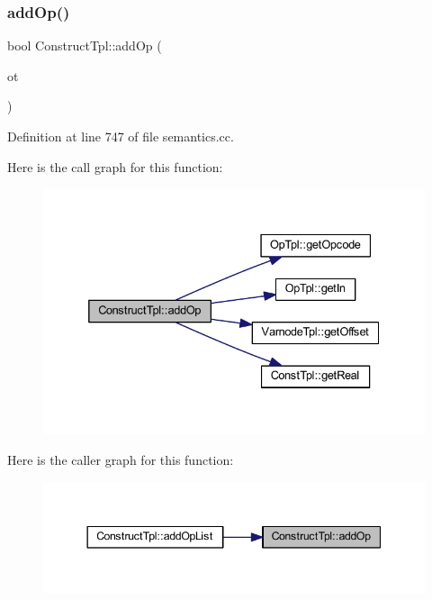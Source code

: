 \subsubsection{\texorpdfstring{addOp()}{addOp()}}
{\footnotesize\ttfamily bool Construct\+Tpl\+::add\+Op (\begin{DoxyParamCaption}\item[{\mbox{\hyperlink{class_op_tpl}{Op\+Tpl}} $\ast$}]{ot }\end{DoxyParamCaption})}



Definition at line 747 of file semantics.\+cc.

Here is the call graph for this function\+:
\nopagebreak
\begin{figure}[H]
\begin{center}
\leavevmode
\includegraphics[width=332pt]{class_construct_tpl_a7a29a748cbd83165ae89751a7f2b7814_cgraph}
\end{center}
\end{figure}
Here is the caller graph for this function\+:
\nopagebreak
\begin{figure}[H]
\begin{center}
\leavevmode
\includegraphics[width=344pt]{class_construct_tpl_a7a29a748cbd83165ae89751a7f2b7814_icgraph}
\end{center}
\end{figure}
\mbox{\label{class_construct_tpl_a1744c9bd849faf17b5a68519fcaa58eb}} 
